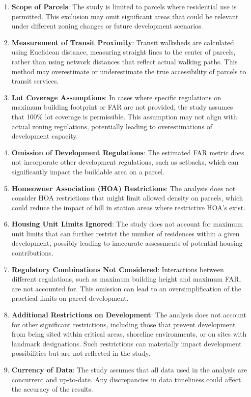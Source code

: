 \documentclass[
]{agujournal2019}
\begin{document}
\begin{enumerate}
\def\labelenumi{\arabic{enumi}.}
\item
  \textbf{Scope of Parcels}: The study is limited to parcels where
  residential use is permitted. This exclusion may omit significant
  areas that could be relevant under different zoning changes or future
  development scenarios.
\item
  \textbf{Measurement of Transit Proximity}: Transit walksheds are
  calculated using Euclidean distance, measuring straight lines to the
  center of parcels, rather than using network distances that reflect
  actual walking paths. This method may overestimate or underestimate
  the true accessibility of parcels to transit services.
\item
  \textbf{Lot Coverage Assumptions}: In cases where specific regulations
  on maximum building footprint or FAR are not provided, the study
  assumes that 100\% lot coverage is permissible. This assumption may
  not align with actual zoning regulations, potentially leading to
  overestimations of development capacity.
\item
  \textbf{Omission of Development Regulations}: The estimated FAR metric
  does not incorporate other development regulations, such as setbacks,
  which can significantly impact the buildable area on a parcel.
\item
  \textbf{Homeowner Association (HOA) Restrictions}: The analysis does
  not consider HOA restrictions that might limit allowed density on
  parcels, which could reduce the impact of bill in station areas where
  restrictive HOA's exist.
\item
  \textbf{Housing Unit Limits Ignored}: The study does not account for
  maximum unit limits that can further restrict the number of residences
  within a given development, possibly leading to inaccurate assessments
  of potential housing contributions.
\item
  \textbf{Regulatory Combinations Not Considered}: Interactions between
  different regulations, such as maximum building height and maximum
  FAR, are not accounted for. This omission can lead to an
  oversimplification of the practical limits on parcel development.
\item
  \textbf{Additional Restrictions on Development}: The analysis does not
  account for other significant restrictions, including those that
  prevent development from being sited within critical areas, shoreline
  environments, or on sites with landmark designations. Such
  restrictions can materially impact development possibilities but are
  not reflected in the study.
\item
  \textbf{Currency of Data}: The study assumes that all data used in the
  analysis are concurrent and up-to-date. Any discrepancies in data
  timeliness could affect the accuracy of the results.
\end{enumerate}
\end{document}
